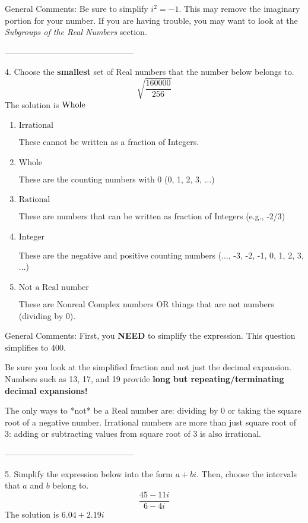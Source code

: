 \documentclass{article}[14pt]
\begin{document}
General Comments: Be sure to simplify $i^2 = -1$. This may remove the imaginary portion for your number. If you are having trouble, you may want to look at the \textit{Subgroups of the Real Numbers} section.

-----------------------------------------------

4. Choose the \textbf{smallest} set of Real numbers that the number below belongs to.
$$ \sqrt{\frac{160000}{256}} $$ 
The solution is $ \text{\text{Whole}} $ 

\begin{enumerate}[label=\Alph*.] 
\item $ \text{Irrational} $ 

 These cannot be written as a fraction of Integers. 
\item $ \text{Whole} $ 

 These are the counting numbers with 0 (0, 1, 2, 3, ...) 
\item $ \text{Rational} $ 

 These are numbers that can be written as fraction of Integers (e.g., -2/3) 
\item $ \text{Integer} $ 

 These are the negative and positive counting numbers (..., -3, -2, -1, 0, 1, 2, 3, ...) 
\item $ \text{Not a Real number} $ 

 These are Nonreal Complex numbers OR things that are not numbers (dividing by 0). 
\end{enumerate} 
 
General Comments: First, you \textbf{NEED} to simplify the expression. This question simplifies to $400$. 
 
 Be sure you look at the simplified fraction and not just the decimal expansion. Numbers such as 13, 17, and 19 provide \textbf{long but repeating/terminating decimal expansions!} 
 
 The only ways to *not* be a Real number are: dividing by 0 or taking the square root of a negative number. Irrational numbers are more than just square root of 3: adding or subtracting values from square root of 3 is also irrational.

-----------------------------------------------

5. Simplify the expression below into the form $a+bi$. Then, choose the intervals that $a$ and $b$ belong to.
$$ \frac{45  - 11 i}{6  - 4 i} $$ 
The solution is $ 6.04  + 2.19 i $ 
\end{document}
